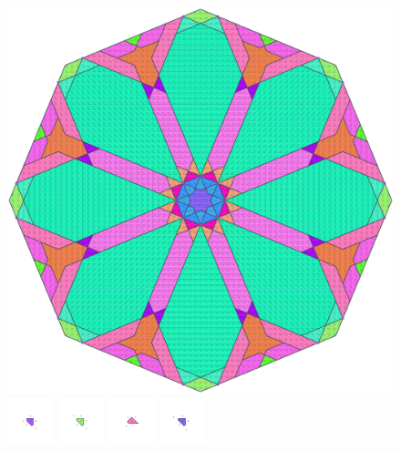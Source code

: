 \documentclass[text.tex]{subfiles}
\begin{document}
\clearpage
\pagestyle{fancy}
\fancyhf{}
\begin{figure}[h!]
\centering
\includegraphics[width=1\textwidth]{img/results/octagon/octagon_229289_(7_-1alpha_2).pdf}
\includegraphics[width=0.12\textwidth]{img/results/octagon/octagon_229289_(7_-1alpha_2)_001.pdf}
\includegraphics[width=0.12\textwidth]{img/results/octagon/octagon_229289_(7_-1alpha_2)_002.pdf}
\includegraphics[width=0.12\textwidth]{img/results/octagon/octagon_229289_(7_-1alpha_2)_003.pdf}
\includegraphics[width=0.12\textwidth]{img/results/octagon/octagon_229289_(7_-1alpha_2)_004.pdf}

\end{figure}
\end{document}
